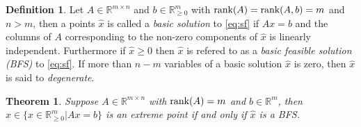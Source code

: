 \documentclass{article}
\newtheorem{theorem}{Theorem}[section]
\theoremstyle{definition}
\newtheorem{definition}{Definition}[section]
\theoremstyle{remark}
\newcommand{\rank}{\textnormal{rank}}
\begin{document}
\begin{definition}
  Let $A \in \mathbb{R}^{m \times n}$ and $b \in \mathbb{R}^{m}_{\geq 0}$ with $\rank(A) = \rank(A, b) = m$ and $n > m$, then a points $\hat{x}$ is called a \textit{basic solution} to \eqref{eq:sf} if $Ax = b$ and the columns of $A$ corresponding to the non-zero components of $\hat{x}$ is linearly independent. Furthermore if $\hat{x} \geq 0$ then $\hat{x}$ is refered to as a \textit{basic feasible solution (BFS)} to \eqref{eq:sf}.
  If more than $n - m$ variables of a basic solution $\hat{x}$ is zero, then $\hat{x}$ is said to \textit{degenerate}.
\end{definition}

\begin{theorem}
  Suppose $A \in \mathbb{R}^{m \times n}$ with $\rank(A) = m$ and $b \in \mathbb{R}^m$, then $\hat{x} \in \{x \in \mathbb{R}^m_{\geq 0} \vert Ax = b \}$ is an extreme point if and only if $\hat{x}$ is a BFS.
\end{theorem}
\end{document}

